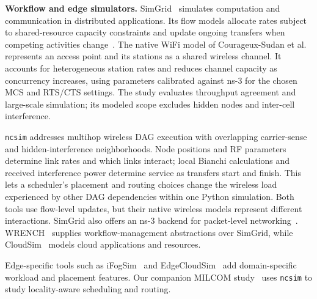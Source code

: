 \documentclass[conference]{IEEEtran}
\newcommand{\ncsim}{\texttt{ncsim}}
\begin{document}
\textbf{Workflow and edge simulators.}
SimGrid~\cite{simgrid} simulates computation and communication in distributed
applications. Its flow models allocate rates subject to shared-resource
capacity constraints and update ongoing transfers when competing activities
change~\cite{simgridmodels}. The native WiFi model of
Courageux-Sudan et al.~\cite{flowwifi2022} represents an access point and
its stations as a shared wireless channel. It accounts for heterogeneous
station rates and reduces channel capacity as concurrency increases, using
parameters calibrated against ns-3 for the chosen MCS and RTS/CTS settings.
The study evaluates throughput agreement and large-scale simulation;
its modeled scope excludes hidden nodes and inter-cell interference.

\ncsim{} addresses multihop wireless DAG execution with overlapping
carrier-sense and hidden-interference neighborhoods. Node positions and RF
parameters determine link rates and which links interact; local Bianchi
calculations and received interference power determine service as transfers
start and finish. This lets a scheduler's placement and routing choices
change the wireless load experienced by other DAG dependencies within one
Python simulation. Both tools use flow-level updates, but their native
wireless models represent different interactions. SimGrid also offers an
ns-3 backend for packet-level networking~\cite{simgridmodels}.
WRENCH~\cite{wrench} supplies workflow-management abstractions over SimGrid,
while CloudSim~\cite{cloudsim} models cloud applications and resources.

Edge-specific tools such as iFogSim~\cite{ifogsim} and
EdgeCloudSim~\cite{edgecloudsim} add domain-specific workload and placement
features. Our companion MILCOM study~\cite{milcom2026} uses \ncsim{} to study
locality-aware scheduling and routing.
\end{document}
